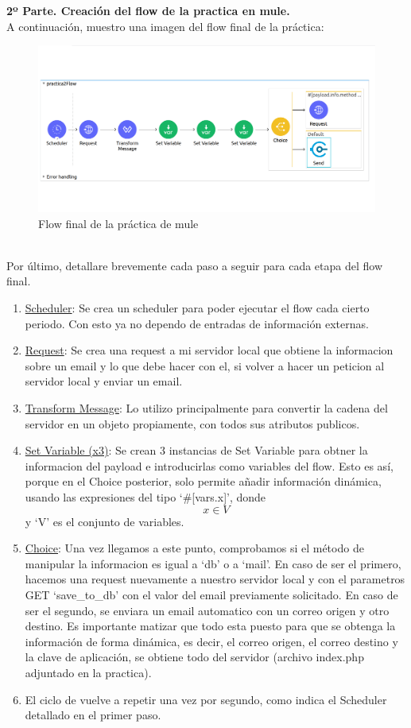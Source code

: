 \documentclass{article}
\begin{document}
\textbf{2º Parte. Creación del flow de la practica en mule.}\\
A continuación, muestro una imagen del flow final de la práctica:\\
\begin{figure}[H]
\centering
\includegraphics[width=0.7\linewidth]{./mule}
\caption{Flow final de la práctica de mule}
\end{figure}
\\
Por último, detallare brevemente cada paso a seguir para cada etapa del flow final.\\

\begin{enumerate}
    \item \underline{Scheduler}: Se crea un scheduler para poder ejecutar el flow cada cierto periodo. Con esto
          ya no dependo de entradas de información externas.
    \item \underline{Request}: Se crea una request a mi servidor local que obtiene la informacion sobre un email
          y lo que debe hacer con el, si volver a hacer un peticion al servidor local y enviar un email.
    \item \underline{Transform Message}: Lo utilizo principalmente para convertir la cadena del servidor en un objeto
          propiamente, con todos sus atributos publicos.
    \item \underline{Set Variable (x3)}: Se crean 3 instancias de Set Variable para obtner la informacion del payload e
          introducirlas como variables del flow. Esto es así, porque en el Choice posterior, solo permite
          añadir información dinámica, usando las expresiones del tipo `\#[vars.x]', donde \[ x \in V \] y
          `V' es el conjunto de variables.
    \item \underline{Choice}: Una vez llegamos a este punto, comprobamos si el método de manipular la informacion es igual
          a `db' o a `mail'. En caso de ser el primero, hacemos una request nuevamente a nuestro servidor local
          y con el parametros GET `save\_to\_db' con el valor del email previamente solicitado. En caso de ser el
          segundo, se enviara un email automatico con un correo origen y otro destino. Es importante matizar que
          todo esta puesto para que se obtenga la información de forma dinámica, es decir, el correo origen,
          el correo destino y la clave de aplicación, se obtiene todo del servidor (archivo index.php adjuntado
          en la practica).
    \item El ciclo de vuelve a repetir una vez por segundo, como indica el Scheduler detallado en el primer paso.
\end{enumerate}
\end{document}

